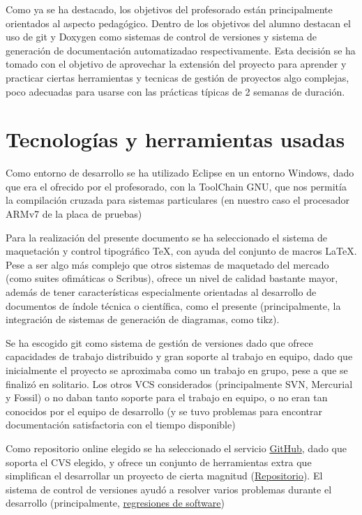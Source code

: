 \documentclass[12pt,letterpaper]{article}
\begin{document}
Como ya se ha destacado, los objetivos del profesorado están
principalmente orientados al aspecto pedagógico. Dentro de los
objetivos del alumno destacan el uso de git y Doxygen como sistemas de
control de versiones y sistema de generación de documentación
automatizadao respectivamente. Esta decisión se ha tomado con el
objetivo de aprovechar la extensión del proyecto para aprender y
practicar ciertas herramientas y tecnicas de gestión de proyectos algo
complejas, poco adecuadas para usarse con las prácticas típicas de 2
semanas de duración.

\section{Tecnologías y herramientas usadas}
\label{sec:tecnologias}
\label{sec:herramientas}

Como entorno de desarrollo se ha utilizado Eclipse en un entorno
Windows, dado que era el ofrecido por el profesorado, con la ToolChain
GNU, que nos permitía la compilación cruzada para sistemas
particulares (en nuestro caso el procesador ARMv7 de la placa de
pruebas)

Para la realización del presente documento se ha seleccionado el
sistema de maquetación y control tipográfico \TeX, con ayuda del
conjunto de macros \LaTeX. Pese a ser algo más complejo que otros
sistemas de maquetado del mercado (como suites ofimáticas o Scribus),
ofrece un nivel de calidad bastante mayor, además de tener
características especialmente orientadas al desarrollo de documentos
de índole técnica o científica, como el presente (principalmente, la
integración de sistemas de generación de diagramas, como tikz).

Se ha escogido git como sistema de gestión de versiones dado que
ofrece capacidades de trabajo distribuido y gran soporte al trabajo en
equipo, dado que inicialmente el proyecto se aproximaba como un
trabajo en grupo, pese a que se finalizó en solitario. Los otros VCS
considerados (principalmente SVN, Mercurial y Fossil) o no daban
tanto soporte para el trabajo en equipo, o no eran tan conocidos por
el equipo de desarrollo (y se tuvo problemas para encontrar
documentación satisfactoria con el tiempo disponible)

Como repositorio online elegido se ha seleccionado el servicio
\href{https://www.github.com}{GitHub}, dado que soporta el CVS
elegido, y ofrece un conjunto de herramientas extra que simplifican el
desarrollar un proyecto de cierta magnitud
(\href{https://www.github.com/wynro/proyecto\_hardware}{Repositorio}).
El sistema de control de versiones ayudó a resolver varios problemas
durante el desarrollo (principalmente,
\href{https://en.wikipedia.org/wiki/Software\_regression}{regresiones
  de software})
\end{document}
